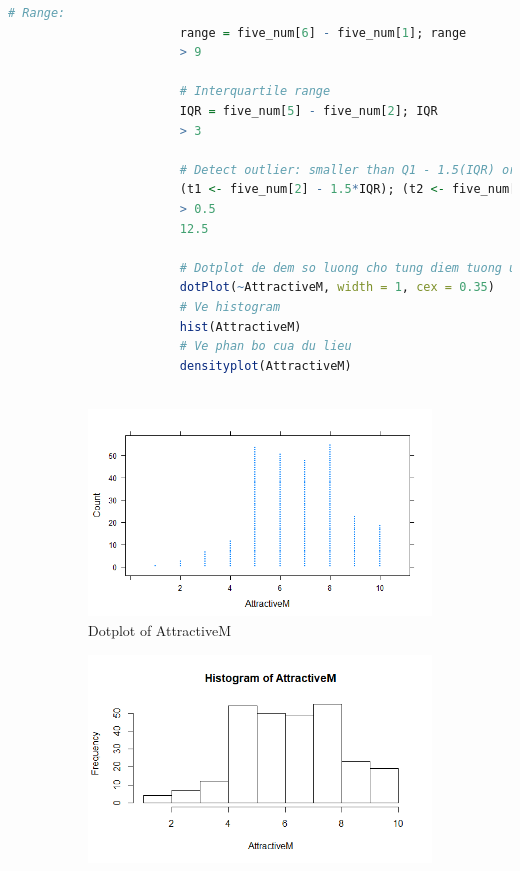 \documentclass[a4paper,12pt]{article}
\begin{document}
\begin{enumerate}[label = {\alph*)}]
\begin{itemize}
\begin{lstlisting}[language = R]
						# Range:
						range = five_num[6] - five_num[1]; range
						> 9
						
						# Interquartile range
						IQR = five_num[5] - five_num[2]; IQR
						> 3
						
						# Detect outlier: smaller than Q1 - 1.5(IQR) or greater than Q3 + 1.5(IQR)
						(t1 <- five_num[2] - 1.5*IQR); (t2 <- five_num[5] + 1.5*IQR)
						> 0.5
						12.5
						
						# Dotplot de dem so luong cho tung diem tuong ung
						dotPlot(~AttractiveM, width = 1, cex = 0.35)
						# Ve histogram
						hist(AttractiveM)
						# Ve phan bo cua du lieu
						densityplot(AttractiveM)
						
					\end{lstlisting}
					
					\begin{figure}[H]
						\centering
						\begin{subfigure}[b]{0.8\linewidth}
							\includegraphics[width=\linewidth]{Images/dotplot1}
							\caption{Dotplot of AttractiveM}
						\end{subfigure}
						\begin{subfigure}[b]{0.4\linewidth}
							\includegraphics[width=\linewidth]{Images/Rplot2}

\end{subfigure}
\end{figure}
\end{itemize}
\end{enumerate}
\end{document}
